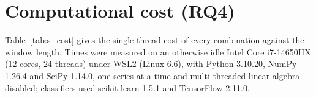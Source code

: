 \documentclass[preprint,12pt]{elsarticle}
\begin{document}
\begin{table}[H]
\centering
\caption{Score on the original windows at $T=128$: accuracy, or macro-F1 for the multilabel PTB-XL.}\label{tab:s_cls_original}
\footnotesize

\end{table}

\begin{table}[H]
\centering
\caption{Drop from the original score, averaged over the six classifiers and the three lengths.}\label{tab:s_cls_drop}
\scriptsize
\setlength{\tabcolsep}{2.5pt}
\resizebox{\textwidth}{!}{}
\end{table}

\begin{table}[H]
\centering
\caption{ESC-10: per-clip accuracy of the original, averaged over the six classifiers, and drop of each combination (3\,000 windows per block).}\label{tab:s_esc10}
\scriptsize
\setlength{\tabcolsep}{2pt}
\resizebox{\textwidth}{!}{}
\end{table}

\section{Computational cost (RQ4)}\label{sec:s_cost}
Table~\ref{tab:s_cost} gives the single-thread cost of every combination against the window length. Times were measured on an otherwise idle Intel Core i7-14650HX (12 cores, 24 threads) under WSL2 (Linux 6.6), with Python 3.10.20, NumPy 1.26.4 and SciPy 1.14.0, one series at a time and multi-threaded linear algebra disabled; classifiers used scikit-learn 1.5.1 and TensorFlow 2.11.0.

\begin{table}[H]
\centering
\caption{Median single-thread time (ms) to encode, store and decode one channel (WISDM, 20 series per length), log--log slope of time against $T$, and peak traced memory at $T=1024$.}\label{tab:s_cost}
\footnotesize

\end{table}
\end{document}
